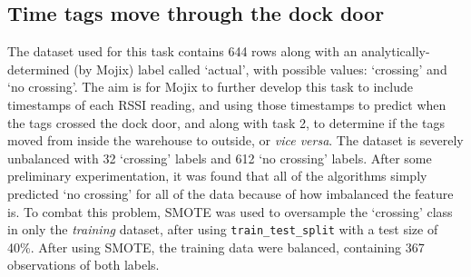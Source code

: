\documentclass{article}
\begin{document}
\subsection{Time tags move through the dock door}

The dataset used for this task contains 644 rows along with an analytically-determined (by Mojix) label called `actual', with possible values: `crossing' and `no crossing'.
The aim is for Mojix to further develop this task to include timestamps of each \ac{RSSI} reading, and using those timestamps to predict when the tags crossed the dock door, and along with task 2, to determine if the tags moved from inside the warehouse to outside, or \emph{vice versa}.
The dataset is severely unbalanced with 32 `crossing' labels and 612 `no crossing' labels.
After some preliminary experimentation, it was found that all of the algorithms simply predicted `no crossing' for all of the data because of how imbalanced the feature is.
To combat this problem, \ac{SMOTE} was used to oversample the `crossing' class in only the \emph{training} dataset, after using \texttt{train\_test\_split} with a test size of 40\%.
After using \ac{SMOTE}, the training data were balanced, containing 367 observations of both labels.
\end{document}
